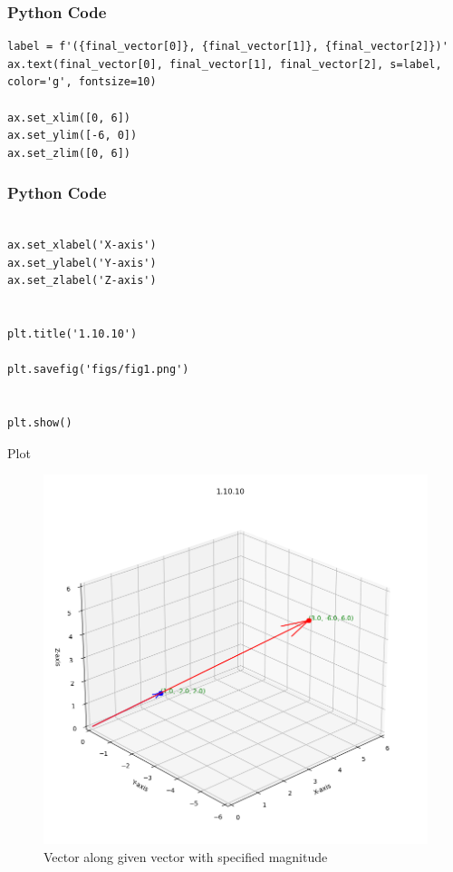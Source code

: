 \documentclass{beamer}
\begin{document}
\begin{frame}[fragile]
\frametitle{Python Code}
\begin{lstlisting}
label = f'({final_vector[0]}, {final_vector[1]}, {final_vector[2]})'
ax.text(final_vector[0], final_vector[1], final_vector[2], s=label, color='g', fontsize=10)

ax.set_xlim([0, 6])
ax.set_ylim([-6, 0])
ax.set_zlim([0, 6])

\end{lstlisting}
\end{frame}

\begin{frame}[fragile]
\frametitle{Python Code}
\begin{lstlisting}

ax.set_xlabel('X-axis')
ax.set_ylabel('Y-axis')
ax.set_zlabel('Z-axis')


plt.title('1.10.10')

plt.savefig('figs/fig1.png')


plt.show()
\end{lstlisting}
\end{frame}

\begin{frame}{Plot}
    \begin{figure}[H]
    \centering
    \includegraphics[width=0.6\columnwidth]{figs/fig1.png}
    \caption{Vector along given vector with specified magnitude}
    \label{3D Plot}
\end{figure}
\end{frame}
\end{document}
